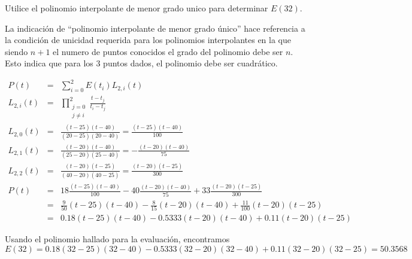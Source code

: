 \documentclass[12pt]{article}
\begin{document}
\begin{enumerate}[leftmargin=*,widest=9]
    
    Utilice el polinomio interpolante de menor grado unico para determinar \(E(32)\).
    
    La indicación de ``polinomio interpolante de menor grado único'' hace referencia a la condición de unicidad requerida para los polinomios interpolantes en la que siendo \(n+1\) el numero de puntos conocidos el grado del polinomio debe ser \(n\). Esto indica que para los 3 puntos dados, el polinomio debe ser cuadrático.
    
    \begin{eqnarray*}
    P(t) & = & \sum_{i=0}^2 E(t_i) L_{2, i}(t) \\
    L_{2, i}(t) & = & \prod_{\substack{j=0 \\ j \neq i}}^{2} \frac{t-t_j}{t_i - t_j}\\
    L_{2, 0}(t) & = & \frac{(t-25)(t-40)}{(20-25)(20-40)} = \frac{(t-25)(t-40)}{100}\\
    L_{2, 1}(t) & = & \frac{(t-20)(t-40)}{(25-20)(25-40)} = -\frac{(t-20)(t-40)}{75}\\
    L_{2, 2}(t) & = & \frac{(t-20)(t-25)}{(40-20)(40-25)} = \frac{(t-20)(t-25)}{300}\\
    P(t) & = & 18 \frac{(t-25)(t-40)}{100} - 40 \frac{(t-20)(t-40)}{75} + 33 \frac{(t-20)(t-25)}{300}\\
    & = & \frac{9}{50}(t-25)(t-40) - \frac{8}{15}(t-20)(t-40) +  \frac{11}{100}(t-20)(t-25)\\
    & = & 0.18(t-25)(t-40) - 0.5333(t-20)(t-40) +  0.11(t-20)(t-25)
    \end{eqnarray*}
    
    Usando el polinomio hallado para la evaluación, encontramos
    \[ E(32) = 0.18(32-25)(32-40) - 0.5333(32-20)(32-40) +  0.11(32-20)(32-25) = 50.3568\]
    
  \end{enumerate}
  
\end{document}
